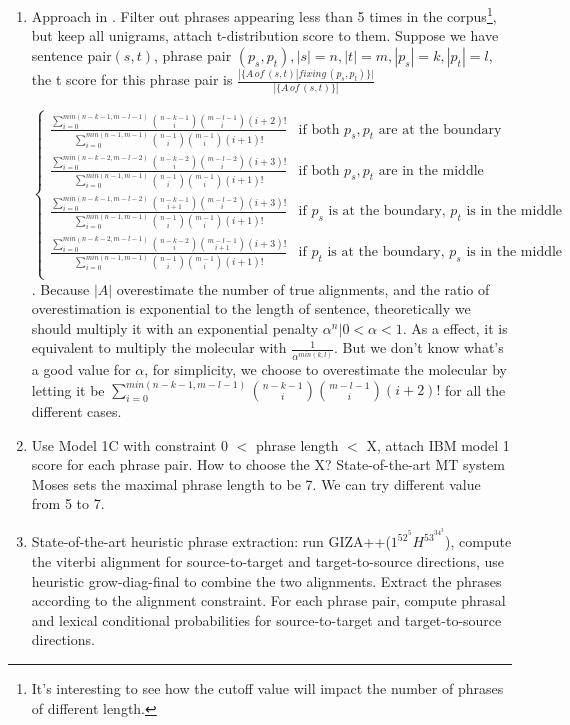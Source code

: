 \documentclass[11pt, letterpaper]{article}   	%
\begin{document}
\begin{enumerate}
\item Approach in \cite{marcu-wong-02}. Filter out phrases appearing less than 5 times in the corpus\footnote{It's interesting to see how the cutoff value will impact the number of phrases of different length.}, but keep all unigrams, attach t-distribution score to them.
Suppose we have sentence pair$(s,t)$, phrase pair $(p_s,p_t), |s|=n, |t|=m,|p_s|=k,|p_t|=l$, the t score for this phrase pair is $\frac{|\{A \,of \,(s,t) | fixing\, (p_s,p_t)\}|}{|\{A\,of \,(s,t)\}|}$

\begin{equation}
\begin{cases}
\frac
{\sum \limits_{i=0}^{min(n-k-1,m-l-1)} {n-k-1 \choose i}{m-l-1 \choose i}(i+2)! }
{\sum \limits_{i=0}^{min(n-1,m-1)} {n-1 \choose i}{m-1 \choose i}(i+1)! }  & \text{if both $p_s, p_t$ are at the boundary} \\
\frac
{\sum \limits_{i=0}^{min(n-k-2,m-l-2)} {n-k-2 \choose i}{m-l-2 \choose i}(i+3)! }
{\sum \limits_{i=0}^{min(n-1,m-1)} {n-1 \choose i}{m-1 \choose i}(i+1)! }  & \text{if both $p_s,p_t$ are in the middle} \\
\frac
{\sum \limits_{i=0}^{min(n-k-1,m-l-2)} {n-k-1 \choose i+1}{m-l-2 \choose i}(i+3)! }
{\sum \limits_{i=0}^{min(n-1,m-1)} {n-1 \choose i}{m-1 \choose i}(i+1)! }  & \text{if $p_s$ is at the boundary, $p_t$ is in the middle} \\
\frac
{\sum \limits_{i=0}^{min(n-k-2,m-l-1)} {n-k-2 \choose i}{m-l-1 \choose i+1}(i+3)! }
{\sum \limits_{i=0}^{min(n-1,m-1)} {n-1 \choose i}{m-1 \choose i}(i+1)! }  & \text{if $p_t$ is at the boundary, $p_s$ is in the middle} \\
\end{cases}
\end{equation}. 
Because $|A|$ overestimate the number of true alignments, and the ratio of overestimation is exponential to the length of sentence, theoretically we should multiply it with an exponential penalty $\alpha^n|0<\alpha<1$. As a effect, it is equivalent to multiply the molecular with $\frac{1}{\alpha^{min(k,l)}}$. But we don't know what's a good value for $\alpha$, for simplicity, we choose to overestimate the molecular by letting it be ${\sum \limits_{i=0}^{min(n-k-1,m-l-1)} {n-k-1 \choose i}{m-l-1 \choose i}(i+2)! }$ for all the different cases.

\item Use Model 1C with constraint 0 $<$ phrase length $<$ X, attach IBM model 1 score for each phrase pair. How to choose the X? State-of-the-art MT system Moses\cite{moses-07} sets the maximal phrase length to be 7. We can try different value from 5 to 7.

\item State-of-the-art heuristic phrase extraction: run GIZA++($1^52^5H^53^34^3$), compute the viterbi alignment for source-to-target and target-to-source directions, use heuristic grow-diag-final to combine the two alignments. Extract the phrases according to the alignment constraint. For each phrase pair, compute phrasal and lexical conditional probabilities for source-to-target and target-to-source directions.
\end{enumerate}
\end{document}
